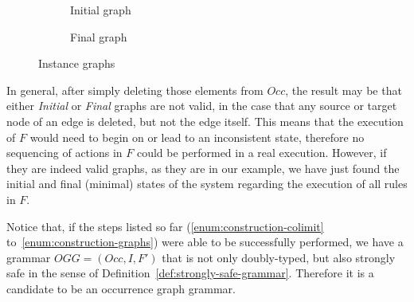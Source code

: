\begin{figure}[!ht]
  \centering
  \begin{subfigure}[t]{.5\textwidth}
    \centerline{}
    \caption{Initial graph}
  \end{subfigure}%
  \begin{subfigure}[t]{.5\textwidth}
    \centerline{}
    \caption{Final graph}
  \end{subfigure}
  \caption{Instance graphs}\label{fig:tests:graphs}
\end{figure}

In general, after simply deleting those elements from $Occ$, the result may be that either \emph{Initial} or \emph{Final} graphs are not valid, in the case that any source or target node of an edge is deleted, but not the edge itself. This means that the execution of $F$ would need to begin on or lead to an inconsistent state, therefore no sequencing of actions in $F$ could be performed in a real execution. However, if they are indeed valid graphs, as they are in our example, we have just found the initial and final (minimal) states of the system regarding the execution of all rules in $F$.

Notice that, if the steps listed so far (\ref{enum:construction-colimit} to~\ref{enum:construction-graphs}) were able to be successfully performed, we have a grammar \mbox{$OGG = \left(Occ, I, F'\right)$} that is not only doubly-typed, but also strongly safe in the sense of Definition~\ref{def:strongly-safe-grammar}. Therefore it is a candidate to be an occurrence graph grammar.

